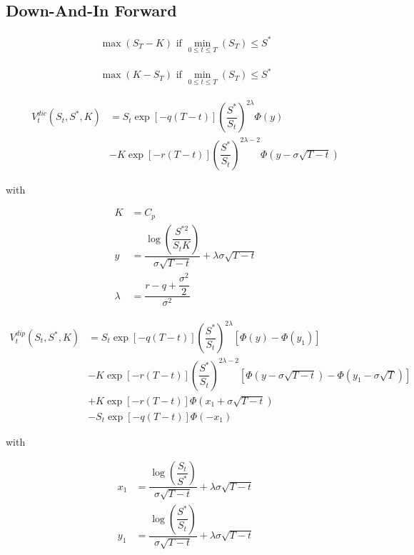 \subsection{Down-And-In Forward}

\begin{align}
    \max \left( S_T - K \right) \text{ if } \min_{0\leq t\leq T} \left( S_T \right) \leq S^*
\end{align}

\begin{align}
    \max \left( K - S_T \right) \text{ if } \min_{0\leq t\leq T} \left( S_T \right) \leq S^*
\end{align}

\begin{align}
V_t^{ dic }\left( S_t , S^* , K \right) &= S_t \exp \left[ - q \left(T-t\right) \right] \left( \dfrac{ S^* }{ S_t } \right) ^ { 2 \lambda } \Phi\left( y \right)\nonumber \\ 
&- K \exp \left[ - r \left(T-t\right) \right] \left( \dfrac{ S^* }{ S_t } \right) ^ { 2 \lambda - 2} \Phi \left( y - \sigma \sqrt{T-t} \right)
\end{align}

with 

\begin{align*}
K &= C_p\\
y &= \dfrac{\log\left( \dfrac{S^{* 2}}{S_t K} \right)}{\sigma \sqrt{T-t}} + \lambda \sigma \sqrt{T-t}\\
\lambda &= \dfrac{r-q+\dfrac{\sigma^2}{2}}{\sigma^2}
\end{align*}

\begin{align}
V_t^{dip}\left( S_t, S^*, K \right) &=  S_t \exp\left[ -q\left(T-t\right) \right] \left( \dfrac{S^*}{S_t} \right)^{2\lambda} \left[ \Phi\left(y\right) - \Phi\left(y_1 \right) \right]\nonumber\\
&- K \exp\left[ -r\left(T-t\right) \right] \left(\dfrac{S^*}{S_t}\right)^{2\lambda-2}\left[ \Phi\left( y- \sigma \sqrt{T-t} \right) -\Phi \left( y_1 - \sigma \sqrt{T} \right) \right] \nonumber\\
&+ K \exp\left[ - r \left(T-t\right) \right] \Phi \left( x_1 + \sigma \sqrt{T-t} \right)\nonumber\\
 &-S_t \exp\left[ -q \left(T-t\right) \right] \Phi\left( -x_1 \right)
\end{align}

with

\begin{align*}
x_1 &= \dfrac{\log\left(\dfrac{S_t}{S^*} \right)}{\sigma \sqrt{T-t}} + \lambda \sigma \sqrt{T-t}\\
y_1 &= \dfrac{\log\left(\dfrac{S^*}{S_t} \right)}{\sigma \sqrt{T-t}} + \lambda \sigma \sqrt{T-t}
\end{align*}

